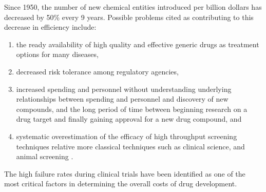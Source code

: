 Since 1950, the number of new chemical entities introduced per billion dollars has decreased by 50\% every 9 years.
Possible problems cited as contributing to this decrease in efficiency include:
\begin{enumerate}
  \item the ready availability of high quality and effective generic drugs as treatment options for many diseases,
  \item decreased risk tolerance among regulatory agencies,
  \item increased spending and personnel without understanding underlying relationships between spending and personnel and discovery of new compounds, and the long period of time between beginning research on a drug target and finally gaining approval for a new drug compound, and
  \item systematic overestimation of the efficacy of high throughput screening techniques relative more classical techniques such as clinical science, and animal screening \cite{scannell2012diagnosing}.
\end{enumerate}

The high failure rates during clinical trials have been identified as one of the most critical factors in determining the overall costs of drug development.
\cite{bleicher2003hit}

